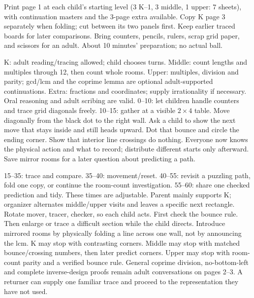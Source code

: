 \documentclass[11pt]{article}
\begin{document}
Print page 1 at each child's starting level (3 K--1, 3 middle, 1 upper: 7 sheets), with continuation masters and the 3-page extra available. Copy K page 3 separately when folding; cut between its two panels first. Keep earlier traced boards for later comparisons. Bring counters, pencils, rulers, scrap grid paper, and scissors for an adult. About 10 minutes' preparation; no actual ball.

K: adult reading/tracing allowed; child chooses turns. Middle: count lengths and multiples through 12, then count whole rooms. Upper: multiples, division and parity; gcd/lcm and the coprime lemma are optional adult-supported continuations. Extra: fractions and coordinates; supply irrationality if necessary. Oral reasoning and adult scribing are valid.
0--10: let children handle counters and trace grid diagonals freely. 10--15: gather at a visible $2\times4$ table. Move diagonally from the black dot to the right wall. Ask a child to show the next move that stays inside and still heads upward. Dot that bounce and circle the ending corner. Show that interior line crossings do nothing. Everyone now knows the physical action and what to record; distribute different starts only afterward. Save mirror rooms for a later question about predicting a path.

15--35: trace and compare. 35--40: movement/reset. 40--55: revisit a puzzling path, fold one copy, or continue the room-count investigation. 55--60: share one checked prediction and tidy. These times are adjustable. Parent mainly supports K; organizer alternates middle/upper visits and leaves a specific next rectangle. Rotate mover, tracer, checker, so each child acts.
First check the bounce rule. Then enlarge or trace a difficult section while the child directs. Introduce mirrored rooms by physically folding a line across one wall, not by announcing the lcm. K may stop with contrasting corners. Middle may stop with matched bounce/crossing numbers, then later predict corners. Upper may stop with room-count parity and a verified bounce rule. General coprime division, no-bottom-left and complete inverse-design proofs remain adult conversations on pages 2--3. A returner can supply one familiar trace and proceed to the representation they have not used.
\newpage
\end{document}
